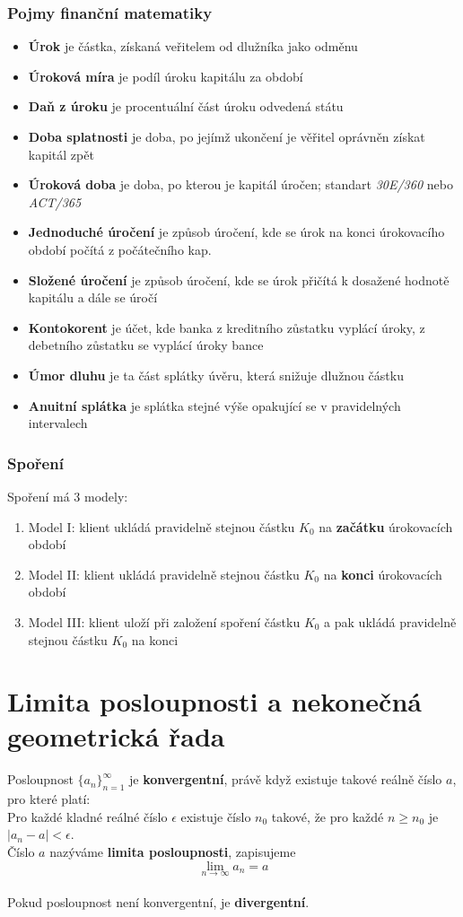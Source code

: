 \documentclass[12pt, a4paper]{article}
\begin{document}
\subsubsection*{Pojmy finanční matematiky}
\begin{itemize}
	\item \textbf{Úrok} je částka, získaná veřitelem od dlužníka jako odměnu
	\item \textbf{Úroková míra} je podíl úroku kapitálu za období
	\item \textbf{Daň z úroku} je procentuální část úroku odvedená státu
	\item \textbf{Doba splatnosti} je doba, po jejímž ukončení je věřitel oprávněn získat kapitál zpět
	\item \textbf{Úroková doba} je doba, po kterou je kapitál úročen; standart \textit{30E/360} nebo \textit{ACT/365}
	\item \textbf{Jednoduché úročení} je způsob úročení, kde se úrok na konci úrokovacího období počítá z počátečního kap.
	\item \textbf{Složené úročení} je způsob úročení, kde se úrok přičítá k dosažené hodnotě kapitálu a dále se úročí
	\item \textbf{Kontokorent} je účet, kde banka z kreditního zůstatku vyplácí úroky, z debetního zůstatku se vyplácí úroky bance
	\item \textbf{Úmor dluhu} je ta část splátky úvěru, která snižuje dlužnou částku
	\item \textbf{Anuitní splátka} je splátka stejné výše opakující se v pravidelných intervalech
\end{itemize}
\subsubsection*{Spoření}
Spoření má 3 modely:\\
\begin{enumerate}
	\item Model I: klient ukládá pravidelně stejnou částku $K_0$ na \textbf{začátku} úrokovacích období
	\item Model II: klient ukládá pravidelně stejnou částku $K_0$ na \textbf{konci} úrokovacích období
	\item Model III: klient uloží při založení spoření částku $K_0$ a pak ukládá pravidelně stejnou částku $K_0$ na konci 
\end{enumerate}

\section{Limita posloupnosti a nekonečná geometrická řada}
Posloupnost $\{a_n\}_{n=1}^{\infty}$ je \textbf{konvergentní}, právě když existuje takové reálně číslo $a$, pro které platí:\\
Pro každé kladné reálné číslo $\epsilon$ existuje číslo $n_0$ takové, že pro každé $n \geq n_0$ je $|a_n-a|<\epsilon$.\\
Číslo $a$ nazýváme \textbf{limita posloupnosti}, zapisujeme \[ \lim_{n \to \infty} a_n = a\]\\
Pokud posloupnost není konvergentní, je \textbf{divergentní}.\\
\end{document}
